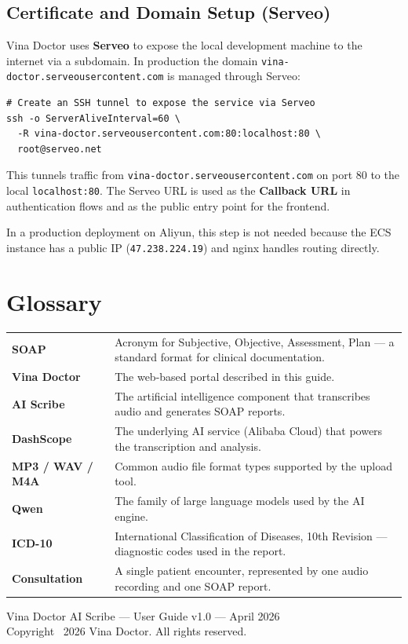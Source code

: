 \documentclass[12pt,a4paper]{article}
\begin{document}
\subsection{Certificate and Domain Setup (Serveo)}

Vina Doctor uses \textbf{Serveo} to expose the local development machine to the
internet via a subdomain. In production the domain
\texttt{vina-doctor.serveousercontent.com} is managed through Serveo:

\begin{verbatim}
# Create an SSH tunnel to expose the service via Serveo
ssh -o ServerAliveInterval=60 \
  -R vina-doctor.serveousercontent.com:80:localhost:80 \
  root@serveo.net
\end{verbatim}

This tunnels traffic from \texttt{vina-doctor.serveousercontent.com} on port 80
to the local \texttt{localhost:80}. The Serveo URL is used as the
\textbf{Callback URL} in authentication flows and as the public entry point
for the frontend.

In a production deployment on Aliyun, this step is not needed because the
ECS instance has a public IP (\texttt{47.238.224.19}) and nginx handles
routing directly.

\section{Glossary}

\begin{tabular}{m{4cm}m{8cm}}
	\textbf{SOAP}            & Acronym for Subjective, Objective, Assessment, Plan — a standard format for clinical documentation. \\
	\textbf{Vina Doctor}     & The web-based portal described in this guide.                                                       \\
	\textbf{AI Scribe}       & The artificial intelligence component that transcribes audio and generates SOAP reports.            \\
	\textbf{DashScope}       & The underlying AI service (Alibaba Cloud) that powers the transcription and analysis.               \\
	\textbf{MP3 / WAV / M4A} & Common audio file format types supported by the upload tool.                                        \\
	\textbf{Qwen}            & The family of large language models used by the AI engine.                                          \\
	\textbf{ICD-10}          & International Classification of Diseases, 10th Revision — diagnostic codes used in the report.      \\
	\textbf{Consultation}    & A single patient encounter, represented by one audio recording and one SOAP report.                 \\
\end{tabular}

\vfill
\color{secondary}\small\raggedright
Vina Doctor AI Scribe — User Guide v1.0 — April 2026 \\
Copyright \textcopyright\ 2026 Vina Doctor. All rights reserved.
\end{document}
